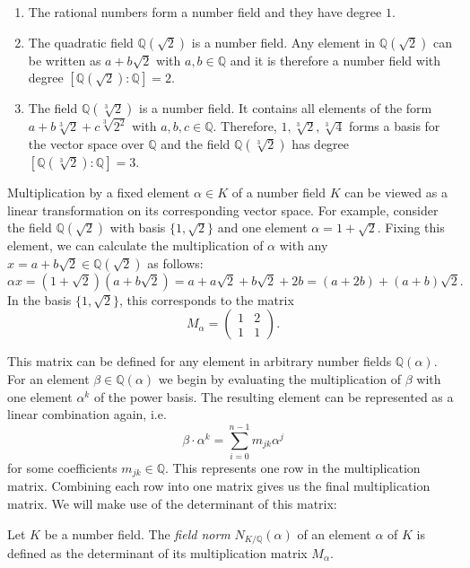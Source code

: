 \begin{example}
  \hfill
  \begin{enumerate}
    \item The rational numbers form a number field and they have degree $1$.
    \item The quadratic field $ℚ(\sqrt{2})$ is a number field.
      Any element in $ ℚ(\sqrt{2})$ can be written as $a + b \sqrt{2}$ with $a,b ∈ ℚ$
      and it is therefore a number field with degree $[ℚ(\sqrt{2}) : ℚ] = 2$.
    \item The field $ℚ(\sqrt[3]{2})$ is a number field.
      It contains all elements of the form $a + b \sqrt[3]{2} + c \sqrt[3]{2^2}$ with $a,b,c ∈ ℚ$.
      Therefore, $1, \sqrt[3]{{2}}, \sqrt[3]{4}$ forms a basis for the vector space over $ℚ$
      and the field $ℚ(\sqrt[3]{2})$ has degree $[ℚ(\sqrt[3]{2}) : ℚ] = 3$.
  \end{enumerate}
\end{example}

Multiplication by a fixed element $α ∈ K$ of a number field $K$ can be viewed
as a linear transformation on its corresponding vector space.
For example, consider the field $ℚ(\sqrt{2})$ with basis $\{1, \sqrt{2}\}$
and one element $α = 1 + \sqrt{2}$.
Fixing this element, we can calculate the multiplication of $α$ with any $x = a
+ b \sqrt{2} ∈ ℚ(\sqrt{2})$ as follows:
\[
  αx = (1 + \sqrt{2})(a + b \sqrt{2}) = a + a \sqrt{2} + b \sqrt{2} + 2b = (a + 2b) + (a + b)\sqrt{2}.
\]
In the basis $\{1, \sqrt{2}\}$, this corresponds to the matrix
\[
  M_α =
  \begin{pmatrix}
    1 & 2 \\
    1 & 1
  \end{pmatrix}.
\]

This matrix can be defined for any element in arbitrary number fields $ℚ(α)$.
For an element $β ∈ ℚ(α)$ we begin by evaluating the
multiplication of $β$ with one element $α^k$ of the power basis.
The resulting element can be represented as a linear combination again,
i.e.
\[
  β · α^k = \sum_{i=0}^{n-1} m_{jk} α^j
\]
for some coefficients $m_{jk} ∈ ℚ$.
This represents one row in the multiplication matrix.
Combining each row into one matrix gives us the final multiplication matrix.
We will make use of the determinant of this matrix:

\begin{definition}
  Let $K$ be a number field.
  The \emph{field norm} $N_{K/ℚ}(α)$ of an element $α$ of $K$ is defined as the
  determinant of its multiplication matrix $M_α$.
\end{definition}

